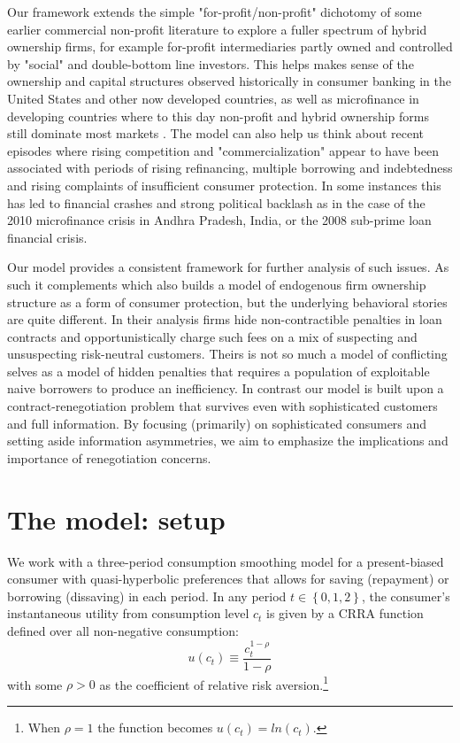 \documentclass[11pt,english]{article}
\theoremstyle{plain}
\theoremstyle{definition}
\begin{document}
Our framework extends the simple "for-profit/non-profit" dichotomy of some earlier commercial non-profit literature to explore a fuller spectrum of hybrid ownership firms, for example for-profit intermediaries partly owned and controlled by "social" and double-bottom line investors. This helps makes sense of the ownership and capital structures observed historically in consumer banking in the United States and other now developed countries, as well as microfinance in developing countries where to this day non-profit
and hybrid ownership forms still dominate most markets \citep{cull2009,conning2011}. The model can also help us think about recent episodes where rising competition and "commercialization" appear to have been associated with periods of rising refinancing, multiple borrowing and indebtedness and rising complaints of insufficient consumer protection. In some instances this has led to financial crashes and strong political backlash as in the case of the 2010 microfinance crisis in Andhra Pradesh, India, or the 2008 sub-prime loan financial crisis.

Our model provides a consistent framework for further analysis of such issues. As such it complements \citet{bubb2013} which also builds a model of endogenous
firm ownership structure as a form of consumer protection, but the
underlying behavioral stories are quite different. In their analysis
firms hide non-contractible penalties in loan contracts and opportunistically
charge such fees on a mix of suspecting and unsuspecting risk-neutral customers. Theirs is not so much a model of conflicting
selves as a model of hidden penalties that requires a population of
exploitable naive borrowers to produce an inefficiency. In contrast
our model is built upon a contract-renegotiation problem that survives even with sophisticated customers and full information. By focusing (primarily) on sophisticated consumers and setting aside information asymmetries, we aim to emphasize the implications and importance of renegotiation concerns.

\section{The model: setup}

We work with a three-period consumption smoothing model for a present-biased
consumer with quasi-hyperbolic preferences that allows for saving
(repayment) or borrowing (dissaving) in each period. In any period
$t\in\left\{ 0,1,2\right\} $, the consumer's instantaneous utility
from consumption level $c_{t}$ is given by a CRRA function defined
over all non-negative consumption: 
\begin{equation}
u\left(c_{t}\right)\equiv\frac{c_{t}^{1-\rho}}{1-\rho}
\end{equation}
with some $\rho>0$ as the coefficient of relative risk aversion.\footnote{When $\rho=1$ the function becomes $u(c_{t})=ln(c_{t})$.}
\end{document}
